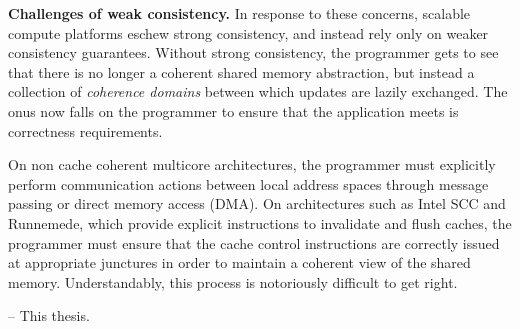 \noindent \textbf{Challenges of weak consistency.} In response to these
concerns, scalable compute platforms eschew strong consistency, and instead
rely only on weaker consistency guarantees. Without strong consistency, the
programmer gets to see that there is no longer a coherent shared memory
abstraction, but instead a collection of \emph{coherence domains} between which
updates are lazily exchanged. The onus now falls on the programmer to ensure
that the application meets is correctness requirements.

On non cache coherent multicore architectures, the programmer must explicitly
perform communication actions between local address spaces through message
passing or direct memory access (DMA). On architectures such as Intel SCC and
Runnemede, which provide explicit instructions to invalidate and flush caches,
the programmer must ensure that the cache control instructions are correctly
issued at appropriate junctures in order to maintain a coherent view of the
shared memory. Understandably, this process is notoriously difficult to get
right.

-- This thesis.


